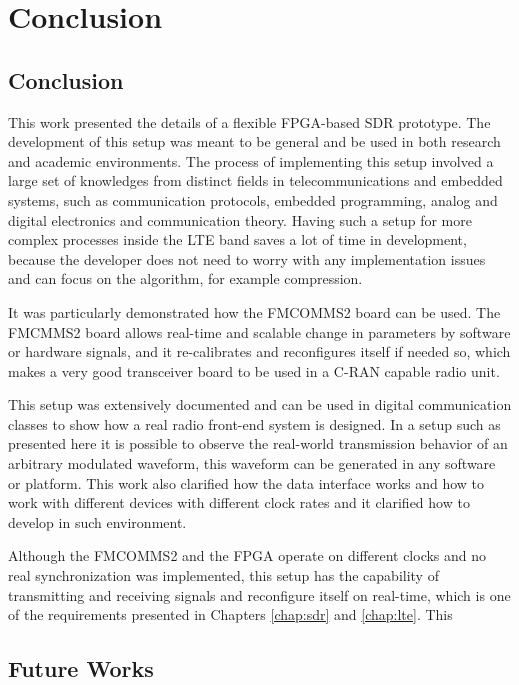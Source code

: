 \chapter{Conclusion}
\label{chap:conclusion}

\section{Conclusion}
\label{sec:conclusion}

This work presented the details of a flexible FPGA-based SDR prototype. The
development of this setup was meant to be general and be used in both research
and academic environments. The process of implementing this setup involved a
large set of knowledges from distinct fields in telecommunications and embedded
systems, such as communication protocols, embedded programming, analog and
digital electronics and communication theory. Having such a setup for more
complex processes inside the LTE band saves a lot of time in development,
because the developer does not need to worry with any implementation issues and
can focus on the algorithm, for example compression.

It was particularly demonstrated how the FMCOMMS2 board can be used. The FMCMMS2
board allows real-time and scalable change in parameters by software or hardware
signals, and it re-calibrates and reconfigures itself if needed so, which makes
a very good transceiver board to be used in a C-RAN capable radio unit.

This setup was extensively documented and can be used in digital communication
classes to show how a real radio front-end system is designed. In a setup such
as presented here it is possible to observe the real-world transmission behavior
of an arbitrary modulated waveform, this waveform can be generated in any
software or platform. This work also clarified how the data interface works and
how to work with different devices with different clock rates and it clarified
how to develop in such environment.

Although the FMCOMMS2 and the FPGA operate on different clocks and no real
synchronization was implemented, this setup has the capability of transmitting
and receiving signals and reconfigure itself on real-time, which is one of the
requirements presented in Chapters \ref{chap:sdr} and \ref{chap:lte}. This

\section{Future Works}
\label{sec:futurew}

